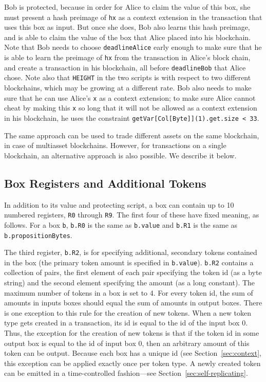 \documentclass[11pt]{article}
\begin{document}
Bob is protected, because in order for Alice to claim the value of this box, she must present a hash preimage of \texttt{hx} as a context extension in the transaction that uses this box as input. But once she does, Bob also learns this hash preimage, and is able to claim the value of the box that Alice placed into his blockchain. Note that Bob needs to choose \texttt{deadlineAlice} early enough to make sure that he is able to learn the preimage of \texttt{hx} from the transaction in Alice's block chain, and create a transaction in his blockchain, all before \texttt{deadlineBob} that Alice chose. Note also that \texttt{HEIGHT} in the two scripts is with respect to two different blockchains, which may be growing at a different rate. Bob also needs to make sure that he can use Alice's \texttt{x} as a context extension; to make sure Alice cannot cheat by making this \texttt{x} so long that it will not be allowed as a context extension in his blockchain, he uses the constraint \texttt{getVar[Col[Byte]](1).get.size < 33}.

The same approach can be used to trade different assets on the same blockchain, in case of multiasset blockchains. However, for transactions on a single blockchain, an alternative approach is also possible. We describe it below.

\subsection{Box Registers and Additional Tokens}
\label{sec:box-registers}
In addition to its value and protecting script, a box can contain up to 10 numbered registers, \texttt{R0} through \texttt{R9}. The first four of these have fixed meaning, as follows. For a box \texttt{b}, \texttt{b.R0} is the same as \texttt{b.value} and \texttt{b.R1} is the same as \texttt{b.propositionBytes}. 


The third register, \texttt{b.R2}, is for specifying additional, secondary tokens contained in the box (the primary token amount is specified in \texttt{b.value}). \texttt{b.R2} contains a collection of pairs, the first element of each pair specifying the token id (as a byte string) and the second element specifying the amount (as a long constant). The maximum number of tokens in a box is set to 4. For every token id, the sum of amounts in inputs boxes should equal the sum of amounts in output boxes. There is one exception to this rule for the creation of new tokens. When a new token type gets created in a transaction, its id is equal to the id of the input box 0. Thus, the exception for the creation of new tokens is that if the token id in some output box is equal to the id of input box 0, then an arbitrary amount of this token can be output. Because each box has a unique id (see Section~\ref{sec:context}, this exception can be applied exactly once per token type. A newly created token can be emitted in a time-controlled fashion---see Section~\ref{sec:self-replicating}.
\end{document}
